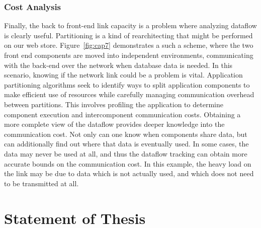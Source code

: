 \documentclass[msc,oneside]{ubcthesis}
\begin{document}
\subsubsection{Cost Analysis}
Finally, the back to front-end link capacity is a problem where analyzing dataflow is clearly useful. Partitioning is a kind of rearchitecting that might be performed on our web store. Figure~\ref{fig:cap7} demonstrates a such a scheme, where the two front end components are moved into independent environments, communicating with the back-end over the network when database data is needed. In this scenario, knowing if the network link could be a problem is vital. Application partitioning algorithms seek to identify ways to split application components to make efficient use of resources while carefully managing communication overhead between partitions. This involves profiling the application to determine component execution and intercomponent communication costs. Obtaining a more complete view of the dataflow provides deeper knowledge into the communication cost. Not only can one know when components share data, but can additionally find out where that data is eventually used. In some cases, the data may never be used at all, and thus the dataflow tracking can obtain more accurate bounds on the communication cost. In this example, the heavy load on the link may be due to data which is not actually used, and which does not need to be transmitted at all.
	

\section{Statement of Thesis}
	
\end{document}
